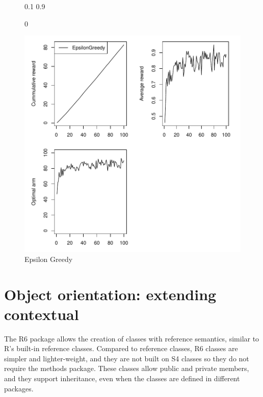 \documentclass[nojss]{jss}
\begin{document}
\begin{figure}
\begin{center}
\begin{Schunk}
\begin{Soutput}
     [,1] [,2]
[1,]  0.1  0.9
\end{Soutput}
\begin{Soutput}
[1] 0
\end{Soutput}
\end{Schunk}
\includegraphics{jss-fig1}
\end{center}
\caption{Epsilon Greedy}
\label{fig:one}
\end{figure}


\section{Object orientation: extending contextual}

The R6 package allows the creation of classes with reference semantics, similar to R's built-in reference classes. Compared to reference classes, R6 classes are simpler and lighter-weight, and they are not built on S4 classes so they do not require the methods package. These classes allow public and private members, and they support inheritance, even when the classes are defined in different packages.
\end{document}

